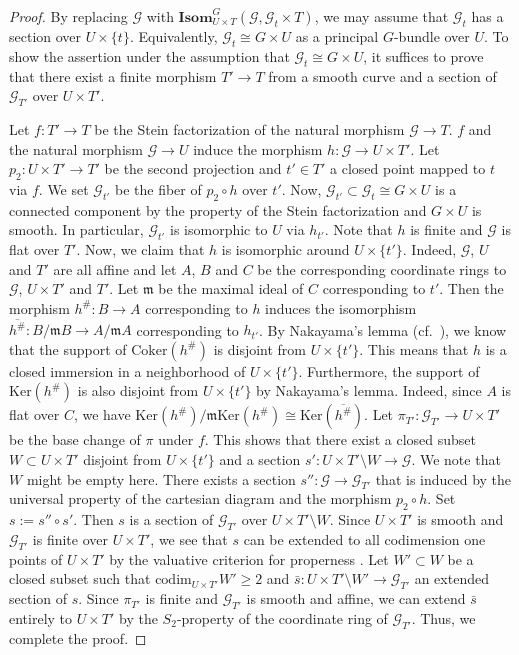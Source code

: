 \documentclass[12pt,twoside]{amsart}
\theoremstyle{definition}
\begin{document}
\begin{proof}
    By replacing $\mathscr{G}$ with $\mathbf{Isom}_{U\times T}^G(\mathscr{G},\mathscr{G}_{t}\times T)$, we may assume that $\mathscr{G}_{t}$ has a section over $U\times\{t\}$. Equivalently, $\mathscr{G}_{t}\cong G\times U$ as a principal $G$-bundle over $U$.
    To show the assertion under the assumption that $\mathscr{G}_{t}\cong G\times U$, it suffices to prove that there exist a finite morphism $T'\to T$ from a smooth curve and a section of $\mathscr{G}_{T'}$ over $U\times T'$.

Let $f\colon T'\to T$ be the Stein factorization of the natural morphism $\mathscr{G}\to T$.
$f$ and the natural morphism $\mathscr{G}\to U$ induce the morphism $h\colon \mathscr{G}\to U\times T'$.
Let $p_2\colon U\times T'\to T'$ be the second projection and $t'\in T'$ a closed point mapped to $t$ via $f$.
We set $\mathscr{G}_{t'}$ be the fiber of $p_2\circ h$ over $t'$.
Now, $\mathscr{G}_{t'}\subset \mathscr{G}_t\cong G\times U$ is a connected component by the property of the Stein factorization and $G\times U$ is smooth.
In particular, $\mathscr{G}_{t'}$ is isomorphic to $U$ via $h_{t'}$.
Note that $h$ is finite and $\mathscr{G}$ is flat over $T'$. 
Now, we claim that $h$ is isomorphic around $U\times \{t'\}$.
Indeed, $\mathscr{G}$, $U$ and $T'$ are all affine and let $A$, $B$ and $C$ be the corresponding coordinate rings to $\mathscr{G}$, $U\times T'$ and $T'$.
Let $\mathfrak{m}$ be the maximal ideal of $C$ corresponding to $t'$.
Then the morphism $h^{\#}\colon B\to A$ corresponding to $h$ induces the isomorphism $\overline{h^{\#}}\colon B/\mathfrak{m}B\to A/\mathfrak{m}A$ corresponding to $h_{t'}$.
By Nakayama's lemma (cf.~\cite[(1.M)]{Mat}), we know that the support of $\mathrm{Coker}(h^{\#})$ is disjoint from $U\times \{t'\}$.
This means that $h$ is a closed immersion in a neighborhood of $U\times \{t'\}$.
Furthermore, the support of $\mathrm{Ker}(h^{\#})$ is also disjoint from $U\times \{t'\}$ by Nakayama's lemma.
Indeed, since $A$ is flat over $C$, we have $\mathrm{Ker}(h^{\#})/\mathfrak{m}\mathrm{Ker}(h^{\#})\cong \mathrm{Ker}(\overline{h^{\#}})$.
Let $\pi_{T'}\colon \mathscr{G}_{T'}\to U\times T'$ be the base change of $\pi$ under $f$.
This shows that there exist a closed subset $W\subset U\times T'$ disjoint from $U\times \{t'\}$ and a section $s'\colon U\times T'\setminus W\to \mathscr{G}$.
We note that $W$ might be empty here.
There exists a section $s''\colon\mathscr{G}\to\mathscr{G}_{T'}$ that is induced by the universal property of the cartesian diagram and the morphism $p_2\circ h$.
Set $s:=s''\circ s'$. 
Then $s$ is a section of $\mathscr{G}_{T'}$ over $U\times T'\setminus W$.
Since $U\times T'$ is smooth and $\mathscr{G}_{T'}$ is finite over $U\times T'$, we see that $s$ can be extended to all codimension one points of $U\times T'$ by the valuative criterion for properness \cite[II, Theorem 4.7]{Ha}.
Let $W'\subset W$ be a closed subset such that $\mathrm{codim}_{U\times T'}W'\ge2$ and $\bar{s}\colon U\times T'\setminus W'\to \mathscr{G}_{T'}$ an extended section of $s$.
Since $\pi_{T'}$ is finite and $\mathscr{G}_{T'}$ is smooth and affine, we can extend $\bar{s}$ entirely to $U\times T'$ by the $S_2$-property of the coordinate ring of $\mathscr{G}_{T'}$.
Thus, we complete the proof.
\end{proof}
\end{document}
